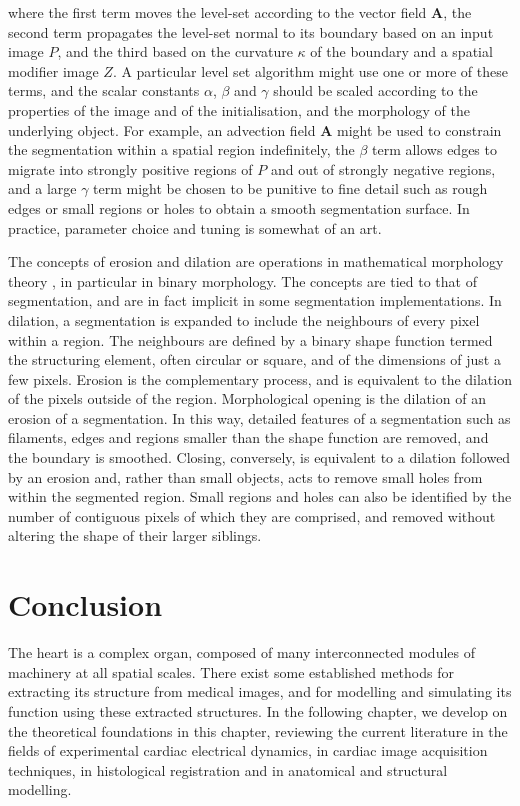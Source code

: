     where the first term moves the level-set according to the vector field \textbf{A}, the second term propagates the level-set normal to its boundary based on an input image $P$, and the third based on the curvature $\kappa$ of the boundary and a spatial modifier image $Z$. A particular level set algorithm might use one or more of these terms, and the scalar constants $\alpha$, $\beta$ and $\gamma$ should be scaled according to the properties of the image and of the initialisation, and the morphology of the underlying object. For example, an advection field $\mathbf{A}$ might be used to constrain the segmentation within a spatial region indefinitely, the $\beta$ term allows edges to migrate into strongly positive regions of $P$ and out of strongly negative regions, and a large $\gamma$ term might be chosen to be punitive to fine detail such as rough edges or small regions or holes to obtain a smooth segmentation surface. In practice, parameter choice and tuning is somewhat of an art.
    
    The concepts of erosion and dilation are operations in mathematical morphology theory \cite{Serra1988}, in particular in binary morphology. The concepts are tied to that of segmentation, and are in fact implicit in some segmentation implementations. In dilation, a segmentation is expanded to include the neighbours of every pixel within a region. The neighbours are defined by a binary shape function termed the structuring element, often circular or square, and of the dimensions of just a few pixels. Erosion is the complementary process, and is equivalent to the dilation of the pixels outside of the region. Morphological opening is the dilation of an erosion of a segmentation. In this way, detailed features of a segmentation such as filaments, edges and regions smaller than the shape function are removed, and the boundary is smoothed. Closing, conversely, is equivalent to a dilation followed by an erosion and, rather than small objects, acts to remove small holes from within the segmented region. Small regions and holes can also be identified by the number of contiguous pixels of which they are comprised, and removed without altering the shape of their larger siblings.
  
  
\section{Conclusion} %
\label{sec:conclusion}
  The heart is a complex organ, composed of many interconnected modules of machinery at all spatial scales. There exist some established methods for extracting its structure from medical images, and for modelling and simulating its function using these extracted structures. In the following chapter, we develop on the theoretical foundations in this chapter, reviewing the current literature in the fields of experimental cardiac electrical dynamics, in cardiac image acquisition techniques, in histological registration and in anatomical and structural modelling.
